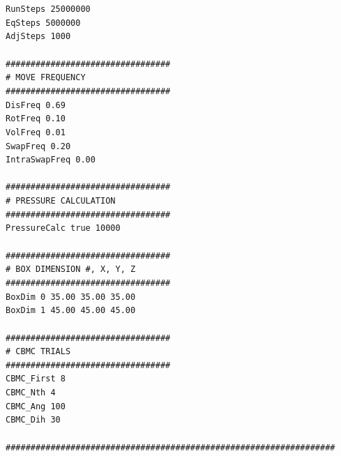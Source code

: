 \texttt{RunSteps           25000000}\\
\texttt{EqSteps		   5000000}\\
\texttt{AdjSteps		   1000}\\
\texttt{}\\
\texttt{\#\#\#\#\#\#\#\#\#\#\#\#\#\#\#\#\#\#\#\#\#\#\#\#\#\#\#\#\#\#\#\#\#}\\
\texttt{\# MOVE FREQUENCY}\\
\texttt{\#\#\#\#\#\#\#\#\#\#\#\#\#\#\#\#\#\#\#\#\#\#\#\#\#\#\#\#\#\#\#\#\#}\\
\texttt{DisFreq         	  0.69}\\
\texttt{RotFreq		  0.10}\\
\texttt{VolFreq		  0.01}\\
\texttt{SwapFreq	  0.20}\\
\texttt{IntraSwapFreq	  0.00}\\
\texttt{}\\
\texttt{\#\#\#\#\#\#\#\#\#\#\#\#\#\#\#\#\#\#\#\#\#\#\#\#\#\#\#\#\#\#\#\#\#}\\
\texttt{\# PRESSURE CALCULATION}\\
\texttt{\#\#\#\#\#\#\#\#\#\#\#\#\#\#\#\#\#\#\#\#\#\#\#\#\#\#\#\#\#\#\#\#\#}\\
\texttt{PressureCalc	true 		10000}\\
\texttt{}\\
\texttt{\#\#\#\#\#\#\#\#\#\#\#\#\#\#\#\#\#\#\#\#\#\#\#\#\#\#\#\#\#\#\#\#\#}\\
\texttt{\# BOX DIMENSION \#, X, Y, Z}\\
\texttt{\#\#\#\#\#\#\#\#\#\#\#\#\#\#\#\#\#\#\#\#\#\#\#\#\#\#\#\#\#\#\#\#\#}\\
\texttt{BoxDim  0    35.00  35.00  35.00}\\
\texttt{BoxDim  1    45.00  45.00  45.00}\\
\texttt{}\\
\texttt{\#\#\#\#\#\#\#\#\#\#\#\#\#\#\#\#\#\#\#\#\#\#\#\#\#\#\#\#\#\#\#\#\#}\\
\texttt{\# CBMC TRIALS}\\
\texttt{\#\#\#\#\#\#\#\#\#\#\#\#\#\#\#\#\#\#\#\#\#\#\#\#\#\#\#\#\#\#\#\#\#}\\
\texttt{CBMC\_First   8}\\
\texttt{CBMC\_Nth     4}\\
\texttt{CBMC\_Ang     100}\\
\texttt{CBMC\_Dih     30}\\
\texttt{}\\
\texttt{\#\#\#\#\#\#\#\#\#\#\#\#\#\#\#\#\#\#\#\#\#\#\#\#\#\#\#\#\#\#\#\#\#\#\#\#\#\#\#\#\#\#\#\#\#\#\#\#\#\#\#\#\#\#\#\#\#\#\#\#\#\#\#\#\#\#}\\
